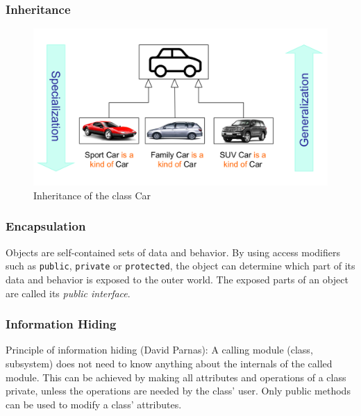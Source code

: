 \subsubsection*{Inheritance}
\begin{figure}[h!]
	\centering
	\includegraphics[width=\linewidth]{images/oop_inheritance}
	\caption{Inheritance of the class \glqq Car\grqq}
\end{figure}

\subsubsection*{Encapsulation}
Objects are self-contained sets of data and behavior.
By using access modifiers such as \texttt{public}, \texttt{private} or \texttt{protected}, the object can determine which part of its data and behavior is exposed to the outer world.
The exposed parts of an object are called its \textit{public interface}.

\subsubsection*{Information Hiding}
Principle of information hiding (David Parnas):
A calling module (class, subsystem) does not need to know anything about the internals of the called module.
This can be achieved by making all attributes and operations of a class private, unless the operations are needed by the class' user.
Only public methods can be used to modify a class' attributes.

